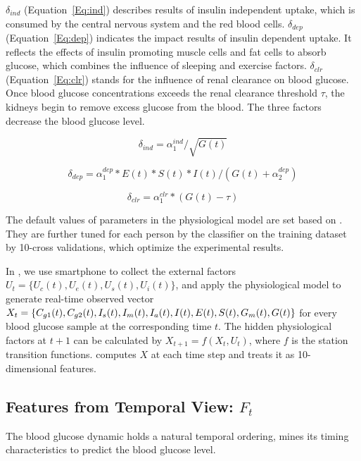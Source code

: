$\delta_{ind}$ (Equation~\ref{Eq:ind}) describes results of insulin independent uptake, which is consumed by the central nervous
system and the red blood cells.
$\delta_{dep}$ (Equation~\ref{Eq:dep}) indicates the impact results of insulin dependent uptake. It reflects the effects
of insulin promoting muscle cells and fat cells to absorb glucose, which combines the influence of sleeping and exercise factors.
$\delta_{clr}$ (Equation~\ref{Eq:clr}) stands for the influence of renal clearance on blood glucose. Once blood glucose
concentrations exceeds the renal clearance threshold $\tau$, the kidneys begin to remove excess glucose from the blood.
The three factors decrease the blood glucose level.

\begin{equation}\label{Eq:ind}
  \delta_{ind}=\alpha_1^{ind}/\sqrt{G(t)}
\end{equation}

\begin{equation}\label{Eq:dep}
  \delta_{dep}=\alpha_1^{dep}* E(t)*S(t)*I(t)/(G(t)+\alpha_2^{dep})
\end{equation}

\begin{equation}\label{Eq:clr}
  \delta_{clr}=\alpha_1^{clr}*(G(t)-\tau)
\end{equation}

The default values of parameters in the physiological model are set
based on \cite{bib:duke2010intelligent}. They are further tuned for each person
by the classifier on the training dataset by 10-cross validations, which optimize
the experimental results.

In \sysname, we use smartphone to collect the external factors $U_t=\{U_c(t),U_e(t),U_s(t), U_i(t)\}$, and
apply the physiological model to generate real-time observed vector
$X_{t}=\{C_{g1}(t), C_{g2}(t),I_{s}(t),I_{m}(t), I_{a}(t), I(t),\\
 E(t), S(t),  G_{m}(t), G(t)\}$ for every blood glucose sample at the corresponding time $t$.
The hidden physiological factors at $t+1$ can be calculated by
$X_{t+1}=f(X_t, U_t)$, where $f$ is the station transition functions.
\sysname computes $X$ at each time step and treats it as 10-dimensional
features.

\subsection{Features from Temporal View: $F_t$}
The blood glucose dynamic holds a natural temporal ordering, \sysname mines its timing characteristics
to predict the blood glucose level.

